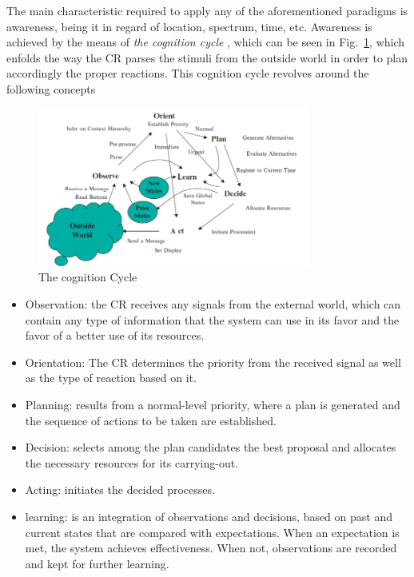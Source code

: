 The main characteristic required to apply any of the aforementioned paradigms is awareness, being it in regard of location, spectrum, time, etc. Awareness is achieved by the means of \emph{the cognition cycle} \cite{Mitola1999}, which can be seen in Fig.~\ref{fig:cognition_cycle}, which enfolds the way the \ac{CR} parses the stimuli from the outside world in order to plan accordingly the proper reactions. This cognition cycle revolves around the following concepts

\begin{figure}[htb]
    \centering
      \includegraphics[width=0.8\textwidth]{figures/cognition_cycle.png}
      \caption{The cognition Cycle\cite{Mitola1999}}
      \label{fig:cognition_cycle}
\end{figure}

\begin{itemize}
    \item Observation: the \ac{CR} receives any signals from the external world, which can contain any type of information that the system can use in its favor and the favor of a better use of its resources.
    \item Orientation: The \ac{CR} determines the priority from the received signal as well as the type of reaction based on it.
    \item Planning: results from a normal-level priority, where a plan is generated and the sequence of actions to be taken are established.
    \item Decision: selects among the plan candidates the best proposal and allocates the necessary resources for its carrying-out.
    \item Acting: initiates the decided processes.
    \item learning: is an integration of observations and decisions, based on past and current states that are compared with expectations. When an expectation is met, the system achieves effectiveness. When not, observations are recorded and kept for further learning.
\end{itemize}

